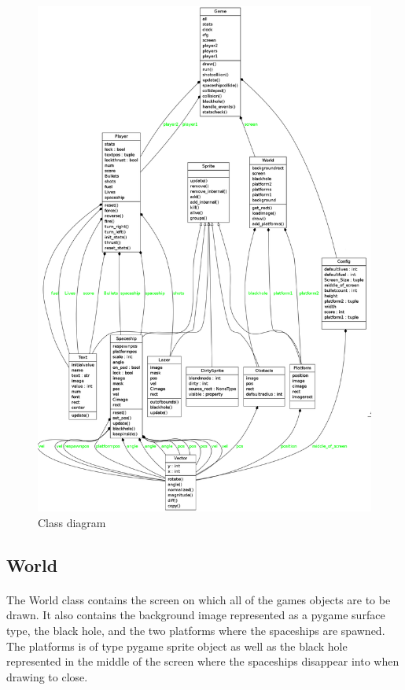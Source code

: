 \documentclass{article}
\begin{document}
\begin{figure}[hbtp]
\caption{Class diagram}
\centering
\includegraphics[scale=0.3]{classdiagram.png}
\end{figure}
\newpage

\subsection{World}
\paragraph{}
The World class contains the screen on which all of the games objects are to be drawn. It also contains the background image represented as a pygame surface type, the black hole, and the two platforms where the spaceships are spawned. The platforms is of type pygame sprite object as well as the black hole represented in the middle of the screen where the spaceships disappear into when drawing to close.
\end{document}
